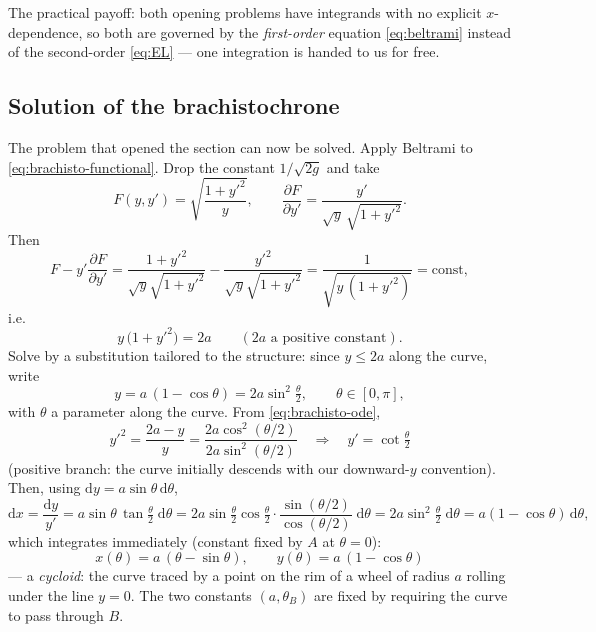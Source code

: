 \documentclass[11pt]{article}
\theoremstyle{plain}
\theoremstyle{definition}
\theoremstyle{remark}
\newcommand{\dd}{\mathrm{d}}
\newcommand{\pd}[2]{\frac{\partial #1}{\partial #2}}
\begin{document}
The practical payoff: both opening problems have integrands with no
explicit $x$-dependence, so both are governed by the \emph{first-order}
equation \eqref{eq:beltrami} instead of the second-order \eqref{eq:EL} ---
one integration is handed to us for free.

\subsection{Solution of the brachistochrone}
\label{sec:brachisto-solution}

The problem that opened the section can now be solved.
Apply Beltrami to \eqref{eq:brachisto-functional}. Drop the constant
$1/\sqrt{2g}$ and take
\begin{equation}
  F(y, y') = \sqrt{\frac{1+y'^2}{y}},
  \qquad
  \pd{F}{y'} = \frac{y'}{\sqrt{y}\,\sqrt{1+y'^2}} .
\end{equation}
Then
\begin{equation}
  F - y'\pd{F}{y'}
  = \frac{1+y'^2}{\sqrt{y}\sqrt{1+y'^2}} - \frac{y'^2}{\sqrt{y}\sqrt{1+y'^2}}
  = \frac{1}{\sqrt{y\,(1+y'^2)}} = \text{const},
\end{equation}
i.e.
\begin{equation}
  y\,\bigl(1 + y'^2\bigr) = 2a
  \qquad (2a \text{ a positive constant}).
  \label{eq:brachisto-ode}
\end{equation}
Solve by a substitution tailored to the structure: since
$y \le 2a$ along the curve, write
\begin{equation}
  y = a\,(1 - \cos\theta) = 2a\sin^2\!\tfrac{\theta}{2},
  \qquad \theta \in [0, \pi],
\end{equation}
with $\theta$ a parameter along the curve. From
\eqref{eq:brachisto-ode},
\begin{equation}
  y'^2 = \frac{2a - y}{y}
  = \frac{2a\cos^2(\theta/2)}{2a\sin^2(\theta/2)}
  \quad\Longrightarrow\quad
  y' = \cot\tfrac{\theta}{2}
\end{equation}
(positive branch: the curve initially descends with our downward-$y$
convention). Then, using $\dd y = a\sin\theta\,\dd\theta$,
\begin{equation}
  \dd x = \frac{\dd y}{y'}
  = a \sin\theta\,\tan\tfrac{\theta}{2}\;\dd\theta
  = 2a\sin\tfrac{\theta}{2}\cos\tfrac{\theta}{2}
    \cdot\frac{\sin(\theta/2)}{\cos(\theta/2)}\;\dd\theta
  = 2a\sin^2\!\tfrac{\theta}{2}\;\dd\theta
  = a(1-\cos\theta)\,\dd\theta ,
\end{equation}
which integrates immediately (constant fixed by $A$ at $\theta = 0$):
\begin{equation}
  \boxed{\;
  x(\theta) = a\,(\theta - \sin\theta),
  \qquad
  y(\theta) = a\,(1 - \cos\theta)
  \;}
\end{equation}
--- a \emph{cycloid}: the curve traced by a point on the rim of a wheel of
radius $a$ rolling under the line $y = 0$. The two constants
$(a, \theta_B)$ are fixed by requiring the curve to pass through $B$.
\end{document}
